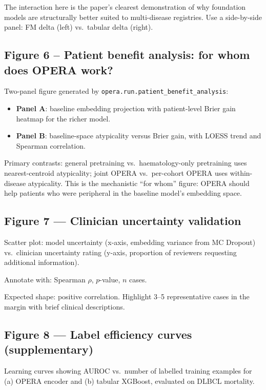 \documentclass[11pt, a4paper]{article}
\newcommand{\code}[1]{\texttt{\small #1}}
\begin{document}
\medskip
\begin{tcolorbox}[notebox]
  The interaction here is the paper's clearest demonstration of why
  foundation models are structurally better suited to multi-disease
  registries. Use a side-by-side panel: FM delta (left) vs.\ tabular
  delta (right).
\end{tcolorbox}

\subsection{Figure 6 -- Patient benefit analysis: for whom does OPERA work?}

Two-panel figure generated by \code{opera.run.patient\_benefit\_analysis}:
\begin{itemize}[leftmargin=2em, itemsep=1pt]
  \item \textbf{Panel A}: baseline embedding projection with patient-level
        Brier gain heatmap for the richer model.
  \item \textbf{Panel B}: baseline-space atypicality versus Brier gain, with
        LOESS trend and Spearman correlation.
\end{itemize}
Primary contrasts: general pretraining vs.\ haematology-only pretraining
uses nearest-centroid atypicality; joint OPERA vs.\ per-cohort OPERA uses
within-disease atypicality. This is the mechanistic ``for whom'' figure:
OPERA should help patients who were peripheral in the baseline model's
embedding space.

\subsection{Figure 7 — Clinician uncertainty validation}

Scatter plot: model uncertainty (x-axis, embedding variance from MC
Dropout) vs.\ clinician uncertainty rating (y-axis, proportion of
reviewers requesting additional information).

Annotate with: Spearman $\rho$, $p$-value, $n$ cases.

Expected shape: positive correlation. Highlight 3--5 representative
cases in the margin with brief clinical descriptions.

\subsection{Figure 8 — Label efficiency curves (supplementary)}

Learning curves showing AUROC vs.\ number of labelled training
examples for (a) OPERA encoder and (b) tabular XGBoost, evaluated on
DLBCL mortality.
\end{document}
